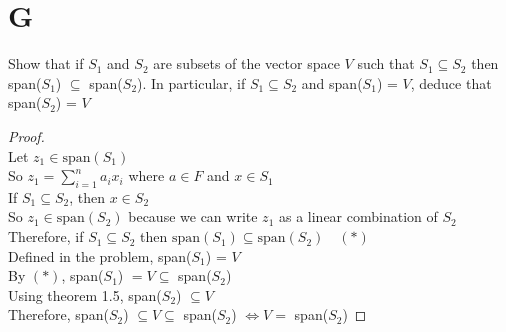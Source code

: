 \documentclass[11pt]{scrartcl}
\begin{document}
\section{G}
Show that if $S_1$ and $S_2$ are subsets of the vector space $V$ such that $S_1 \subseteq S_2$ then span($S_1$) $\subseteq$ span($S_2$). 
In particular, if $S_1 \subseteq S_2$ and span($S_1$) = $V$, deduce that span($S_2$) = $V$
\begin{proof}
	\-\\
	Let $z_1 \in \text{span}(S_1)$ \\ %
	So $z_1 = \sum_{i=1}^{n}a_ix_i$ where $a \in F$ and $x \in S_1$\\
	If $S_1 \subseteq S_2$, then $x \in S_2$\\
	So $z_1 \in \text{span}(S_2)$ because we can write $z_1$ as a linear combination of $S_2$\\
	Therefore, if  $S_1 \subseteq S_2$ then $\text{span}(S_1) \subseteq \text{span}(S_2) \quad (*)$\\
	Defined in the problem, span($S_1$) = $V$\\
	By $(*)$, span($S_1$) $= V \subseteq$ span($S_2$)\\
	Using theorem 1.5, span($S_2$) $\subseteq V$\\
	Therefore, span($S_2$) $\subseteq V \subseteq$ span($S_2$) $\Leftrightarrow V = $ span($S_2$)
\end{proof}
\end{document}

